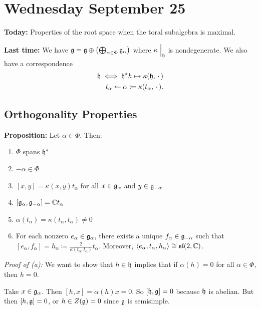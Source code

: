 \hypertarget{wednesday-september-25}{%
\section{Wednesday September 25}\label{wednesday-september-25}}

\textbf{Today:} Properties of the root space when the toral subalgebra
is maximal.

\textbf{Last time:} We have
\({\mathfrak{g}} = {\mathfrak{g}} \oplus \left( \bigoplus_{\alpha \in \Phi} {\mathfrak{g}}_\alpha \right)\)
where \(\kappa\mathrel{\Big|}_{{\mathfrak{h}}}\) is nondegenerate. We also have a
correspondence \begin{align*}
{\mathfrak{h}} \iff {\mathfrak{h}}^*
h \mapsto \kappa({\mathfrak{h}}, {\,\cdot\,}) \\
t_\alpha \leftarrow \alpha \coloneqq \kappa(t_\alpha, {\,\cdot\,})
.\end{align*}

\hypertarget{orthogonality-properties}{%
\subsection{Orthogonality Properties}\label{orthogonality-properties}}

\textbf{Proposition:} Let \(\alpha \in \Phi\). Then:

\begin{enumerate}
\def\labelenumi{\alph{enumi}.}
\tightlist
\item
  \(\Phi\) spans \({\mathfrak{h}}^*\)
\item
  \(-\alpha \in \Phi\)
\item
  \([x, y] = \kappa(x,y)t_\alpha\) for all \(x\in {\mathfrak{g}}_\alpha\) and
  \(y\in {\mathfrak{g}}_{-\alpha}\)
\item
  \([{\mathfrak{g}}_\alpha, {\mathfrak{g}}_{-\alpha}] = {\mathbb{C}} t_\alpha\)
\item
  \(\alpha(t_\alpha) = \kappa(t_\alpha, t_\alpha) \neq 0\)
\item
  For each nonzero \(e_\alpha \in {\mathfrak{g}}_\alpha\), there exists a unique
  \(f_\alpha \in {\mathfrak{g}}_{-\alpha}\) such that
  \([e_\alpha, f_\alpha] = h_\alpha \coloneqq \frac{2}{\kappa(t_\alpha, t_\alpha)}t_\alpha\).
  Moreover,
  \(\left\langle{e_\alpha, t_\alpha, h_\alpha}\right\rangle \cong {\mathfrak{sl}}(2, {\mathbb{C}})\).
\end{enumerate}

\emph{Proof of (a):} We want to show that \(h \in {\mathfrak{h}}\) implies that
if \(\alpha(h) = 0\) for all \(\alpha \in \Phi\), then \(h = 0\).

Take \(x\in {\mathfrak{g}}_\alpha\). Then \([h, x] = \alpha(h)x = 0\). So
\([{\mathfrak{h}}, {\mathfrak{g}}] = 0\) because \({\mathfrak{h}}\) is abelian. But then
\([h, {\mathfrak{g}}] = 0\), or \(h \in Z({\mathfrak{g}}) = 0\) since \({\mathfrak{g}}\) is
semisimple.

